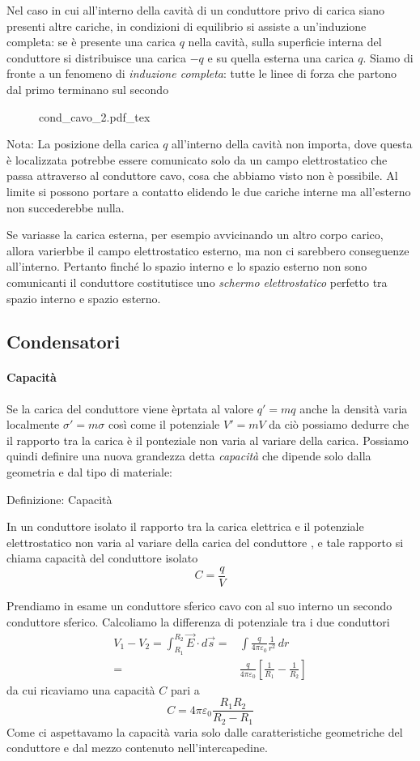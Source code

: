 \documentclass[x11names]{report}
\newcommand{\definizione}[2]{
	\begin{center}
		\fboxsep11pt
		\colorbox{myblue}{\begin{minipage}{5.75in}
				\begin{blues}{Definizione: #1}
					#2
				\end{blues}
		\end{minipage}}
	\end{center}
}
\newcommand{\nota}[2]{
	\begin{attenzione}{Nota:}
		#2
	\end{attenzione}
}
\newcommand{\incfig}[1]{%
	{#1.pdf_tex}
}
\begin{document}
\noindent
Nel caso in cui all'interno della cavità di un conduttore privo di carica siano presenti altre cariche, in condizioni di equilibrio si assiste a un'induzione completa: se è presente una carica \(q\) nella cavità, sulla superficie interna del conduttore si distribuisce una carica \(-q\) e su quella esterna una carica \(q\). Siamo di fronte a un fenomeno di \textit{induzione completa}: tutte le linee di forza che partono dal primo terminano sul secondo
\begin{figure}[H]
	\centering
	\incfig{cond_cavo_2}
\end{figure}
\nota{}{La posizione della carica \(q\) all'interno della cavità non importa, dove questa è localizzata potrebbe essere comunicato solo da un campo elettrostatico che passa attraverso al conduttore cavo, cosa che abbiamo visto non è possibile. Al limite si possono portare a contatto elidendo le due cariche interne ma all'esterno non succederebbe nulla.}

Se variasse la carica esterna, per esempio avvicinando un altro corpo carico, allora varierbbe il campo elettrostatico esterno, ma non ci sarebbero conseguenze all'interno. Pertanto finché lo spazio interno e lo spazio esterno non sono comunicanti il conduttore costitutisce uno \textit{schermo elettrostatico} perfetto tra spazio interno e spazio esterno.

\subsection{Condensatori}
\paragraph{Capacità}
Se la carica del conduttore viene èprtata al valore \(q' = mq\) anche la densità varia localmente \(\sigma'=m\sigma\) così come il potenziale \(V'=mV\) da ciò possiamo dedurre che il rapporto tra la carica è il ponteziale non varia al variare della carica. Possiamo quindi definire una nuova grandezza detta \textit{capacità} che dipende solo dalla geometria e dal tipo di materiale:
\definizione{Capacità}{
In un conduttore isolato il rapporto tra la carica elettrica e il potenziale elettrostatico non varia al variare della carica del conduttore , e tale rapporto si chiama capacità del conduttore isolato
\begin{equation}
	C = \frac{q}{V}
\end{equation}
}
Prendiamo in esame un conduttore sferico cavo con al suo interno un secondo conduttore sferico. Calcoliamo la differenza di potenziale tra i due conduttori
\begin{align*}
	V_1 - V_2 = \int_{R_1}^{R_2} \vec{E}\cdot d\vec{s} =& \int \frac{q}{4\pi \varepsilon_0} \frac{1}{r^2} \, dr \\
	=& \frac{q}{4\pi \varepsilon_0}\left[\frac{1}{R_1} - \frac{1}{R_2}\right]
\end{align*}
da cui ricaviamo una capacità \(C\) pari a 
\[
C = 4\pi\varepsilon_0\frac{R_1R_2}{R_2 - R_1}
\]
Come ci aspettavamo la capacità varia solo dalle caratteristiche geometriche del conduttore e dal mezzo contenuto nell'intercapedine. 
\end{document}
